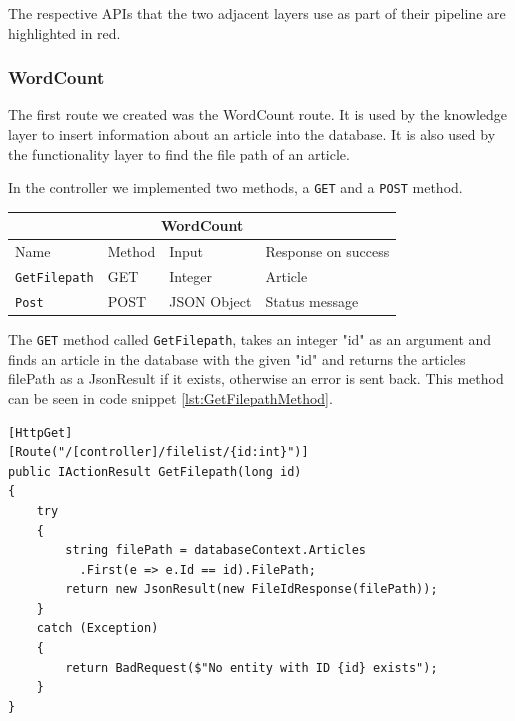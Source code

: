 The respective APIs that the two adjacent layers use as part of their pipeline are highlighted in red. 

\subsubsection{WordCount}

The first route we created was the WordCount route. It is used by the knowledge layer to insert information about an article into the database. It is also used by the functionality layer to find the file path of an article.

In the controller we implemented two methods, a \texttt{GET} and a \texttt{POST} method.
\begin{table}[h]
    \begin{tabular}{|llll|}
    \hline
    \multicolumn{4}{|c|}{\textbf{WordCount}}                                                                                 \\ \hline
    \multicolumn{1}{|l|}{Name}                 & \multicolumn{1}{l|}{Method} & \multicolumn{1}{l|}{Input}       & Response on success       \\ \hline
    \multicolumn{1}{|l|}{\texttt{GetFilepath}} & \multicolumn{1}{l|}{GET}    & \multicolumn{1}{l|}{Integer}     & Article        \\ \hline
    \multicolumn{1}{|l|}{\texttt{Post}}        & \multicolumn{1}{l|}{POST}   & \multicolumn{1}{l|}{JSON Object} & Status message \\ \hline
    \end{tabular}
\end{table}

The \texttt{GET} method called \texttt{GetFilepath}, takes an integer "id" as an argument and finds an article in the database with the given "id" and returns the articles filePath as a JsonResult if it exists, otherwise an error is sent back.
This method can be seen in code snippet \ref{lst:GetFilepathMethod}.

\begin{lstlisting}[language=CSharp, caption={The \texttt{GetFilepath} method.}, label={lst:GetFilepathMethod}]
[HttpGet]
[Route("/[controller]/filelist/{id:int}")]
public IActionResult GetFilepath(long id)
{
    try
    {
        string filePath = databaseContext.Articles
          .First(e => e.Id == id).FilePath;
        return new JsonResult(new FileIdResponse(filePath));
    }
    catch (Exception)
    {
        return BadRequest($"No entity with ID {id} exists");
    }
}
\end{lstlisting}

